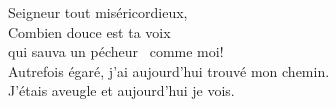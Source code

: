 Seigneur tout miséricordieux,\\
Combien douce est ta voix\\
qui sauva un pécheur  comme moi!\\
Autrefois égaré,
j'ai aujourd'hui trouvé mon chemin.\\
J'étais aveugle et aujourd'hui je vois.\\
